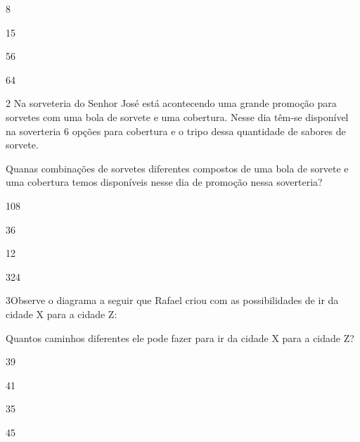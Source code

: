 \begin{escolha}
\item
  8
\item
  15
\item
  56
\item
  64
\end{escolha}


\num{2} Na sorveteria do Senhor José está acontecendo uma grande promoção
para sorvetes com uma bola de sorvete e uma cobertura. Nesse dia têm-se
disponível na soverteria 6 opções para cobertura e o tripo dessa
quantidade de sabores de sorvete.

Quanas combinações de sorvetes diferentes compostos de uma bola de
sorvete e uma cobertura temos disponíveis nesse dia de promoção nessa
soverteria?

\begin{escolha}
\item
  108
\item
  36
\item
  12
\item
  324
\end{escolha}


\num{3}Observe o diagrama a seguir que Rafael criou com as possibilidades
de ir da cidade X para a cidade Z:

%

Quantos caminhos diferentes ele pode fazer para ir da cidade X para a
cidade Z?

\begin{escolha}
\item
  39
\item
  41
\item
  35
\item
  45
\end{escolha}


